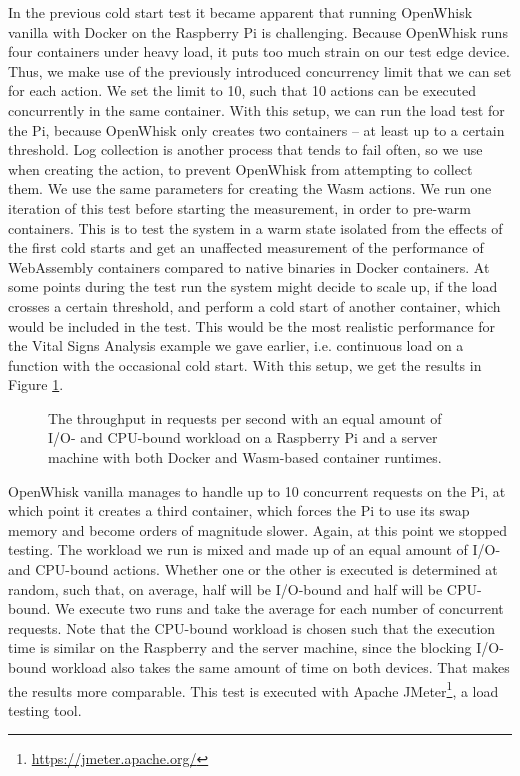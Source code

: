 In the previous cold start test it became apparent that running OpenWhisk vanilla with Docker on the Raspberry Pi is challenging. Because OpenWhisk runs four containers under heavy load, it puts too much strain on our test edge device. Thus, we make use of the previously introduced concurrency limit that we can set for each action. We set the limit to 10, such that 10 actions can be executed concurrently in the same container. With this setup, we can run the load test for the Pi, because OpenWhisk only creates two containers -- at least up to a certain threshold. Log collection is another process that tends to fail often, so we use  when creating the action, to prevent OpenWhisk from attempting to collect them. We use the same parameters for creating the Wasm actions. We run one iteration of this test before starting the measurement, in order to pre-warm containers. This is to test the system in a warm state isolated from the effects of the first cold starts and get an unaffected measurement of the performance of WebAssembly containers compared to native binaries in Docker containers. At some points during the test run the system might decide to scale up, if the load crosses a certain threshold, and perform a cold start of another container, which would be included in the test. This would be the most realistic performance for the Vital Signs Analysis example we gave earlier, i.e. continuous load on a function with the occasional cold start. With this setup, we get the results in Figure \ref{fig:pi-pc-load-mixed}.

\begin{figure}
    \begin{center}
        
    \end{center}
    \caption{The throughput in requests per second with an equal amount of I/O- and CPU-bound workload on a Raspberry Pi and a server machine with both Docker and Wasm-based container runtimes.}
    \label{fig:pi-pc-load-mixed}
\end{figure}

OpenWhisk vanilla manages to handle up to 10 concurrent requests on the Pi, at which point it creates a third container, which forces the Pi to use its swap memory and become orders of magnitude slower. Again, at this point we stopped testing. The workload we run is mixed and made up of an equal amount of I/O- and CPU-bound actions. Whether one or the other is executed is determined at random, such that, on average, half will be I/O-bound and half will be CPU-bound. We execute two runs and take the average for each number of concurrent requests. Note that the CPU-bound workload is chosen such that the execution time is similar on the Raspberry and the server machine, since the blocking I/O-bound workload also takes the same amount of time on both devices. That makes the results more comparable. This test is executed with Apache JMeter\footnote{\url{https://jmeter.apache.org/}}, a load testing tool. 

